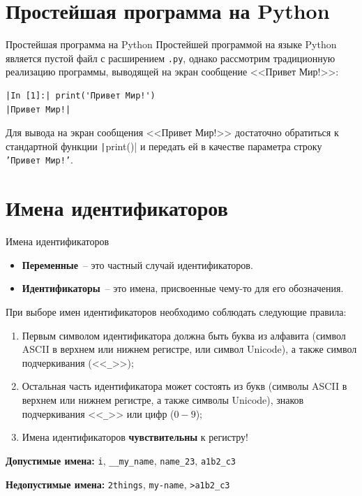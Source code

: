 \documentclass[aspectratio=169]{beamer}	%
\begin{document}
\section{Простейшая программа на Python}

\begin{frame}[fragile]{Простейшая программа на Python}
\scriptsize
Простейшей программой на языке Python является пустой файл с расширением \texttt{.py}, однако рассмотрим традиционную реализацию программы, выводящей на экран сообщение <<Привет Мир!>>:

\begin{verbatim}
|In [1]:| print('Привет Мир!')
|Привет Мир!|
\end{verbatim}

Для вывода на экран сообщения <<Привет Мир!>> достаточно обратиться к стандартной функции \texttt|print()| и передать ей в качестве параметра строку \texttt{'Привет Мир!'}.
\vfill
\end{frame}


\section{Имена идентификаторов}
\sectionframe

\begin{frame}[fragile]{Имена идентификаторов}
\scriptsize
\begin{itemize}
	\item \textcolor{extraorange}{\textbf{Переменные}}~-- это частный случай идентификаторов.
	\item \textcolor{extraorange}{\textbf{Идентификаторы}}~-- это имена, присвоенные чему-то для его обозначения.
\end{itemize}
\bigskip
При выборе имен идентификаторов необходимо соблюдать следующие правила:
\begin{enumerate}
	\item Первым символом идентификатора должна быть буква из алфавита (символ ASCII в верхнем или нижнем регистре, или символ Unicode), а также символ подчеркивания (<<\texttt{\_}>>);
	\item Остальная часть идентификатора может состоять из букв (символы ASCII в верхнем или нижнем регистре, а также символы Unicode), знаков подчеркивания <<\texttt{\_}>> или цифр ($0-9$);
	\item Имена идентификаторов \alert{\textbf{чувствительны}} к регистру!
\end{enumerate}
\bigskip
\alert{\textbf{Допустимые имена:}} \texttt{i}, \texttt{\_\_my\_name}, \texttt{name\_23}, \texttt{a1b2\_c3}

\alert{\textbf{{\color{red}Недопустимые имена:}}} \texttt{2things}, \texttt{my-name}, \texttt{>a1b2\_c3}
\vfill
\end{frame}
\end{document}
